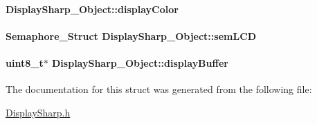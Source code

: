 \paragraph[{display\+Color}]{ Display\+Sharp\+\_\+\+Object\+::display\+Color}\label{struct_display_sharp___object_a99bea24fb7ee15769a37eb53087daf22}
\paragraph[{sem\+L\+C\+D}]{\setlength{\rightskip}{0pt plus 5cm}Semaphore\+\_\+\+Struct Display\+Sharp\+\_\+\+Object\+::sem\+L\+C\+D}\label{struct_display_sharp___object_ae4ac08f3416782d171264aeee1e03fc4}
\paragraph[{display\+Buffer}]{\setlength{\rightskip}{0pt plus 5cm}uint8\+\_\+t$\ast$ Display\+Sharp\+\_\+\+Object\+::display\+Buffer}\label{struct_display_sharp___object_a268dce94be3fcbae2e9d317810269932}


The documentation for this struct was generated from the following file\+:\begin{DoxyCompactItemize}
\item 
\hyperlink{_display_sharp_8h}{Display\+Sharp.\+h}\end{DoxyCompactItemize}
